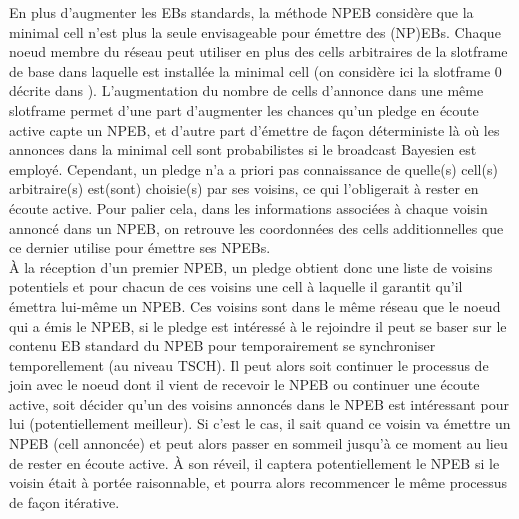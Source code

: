 \documentclass[]{report}
\begin{document}
En plus d'augmenter les EBs standards, la méthode NPEB considère que la minimal cell n'est plus la seule envisageable pour émettre des (NP)EBs. Chaque noeud membre du réseau peut utiliser en plus des cells arbitraires de la slotframe de base dans laquelle est installée la minimal cell (on considère ici la slotframe 0 décrite dans \cite{rfc8180}). L'augmentation du nombre de cells d'annonce dans une même slotframe permet d'une part d'augmenter les chances qu'un pledge en écoute active capte un NPEB, et d'autre part d'émettre de façon déterministe là où les annonces dans la minimal cell sont probabilistes si le broadcast Bayesien est employé. Cependant, un pledge n'a a priori pas connaissance de quelle(s) cell(s) arbitraire(s) est(sont) choisie(s) par ses voisins, ce qui l'obligerait à rester en écoute active. Pour palier cela, dans les informations associées à chaque voisin annoncé dans un NPEB, on retrouve les coordonnées des cells additionnelles que ce dernier utilise pour émettre ses NPEBs.\\

À la réception d'un premier NPEB, un pledge obtient donc une liste de voisins potentiels et pour chacun de ces voisins une cell à laquelle il garantit qu'il émettra lui-même un NPEB. Ces voisins sont dans le même réseau que le noeud qui a émis le NPEB, si le pledge est intéressé à le rejoindre il peut se baser sur le contenu EB standard du NPEB pour temporairement se synchroniser temporellement (au niveau TSCH). Il peut alors soit continuer le processus de join avec le noeud dont il vient de recevoir le NPEB ou continuer une écoute active, soit décider qu'un des voisins annoncés dans le NPEB est intéressant pour lui (potentiellement meilleur). Si c'est le cas, il sait quand ce voisin va émettre un NPEB (cell annoncée) et peut alors passer en sommeil jusqu'à ce moment au lieu de rester en écoute active. À son réveil, il captera potentiellement le NPEB si le voisin était à portée raisonnable, et pourra alors recommencer le même processus de façon itérative.

\newpage
\end{document}
